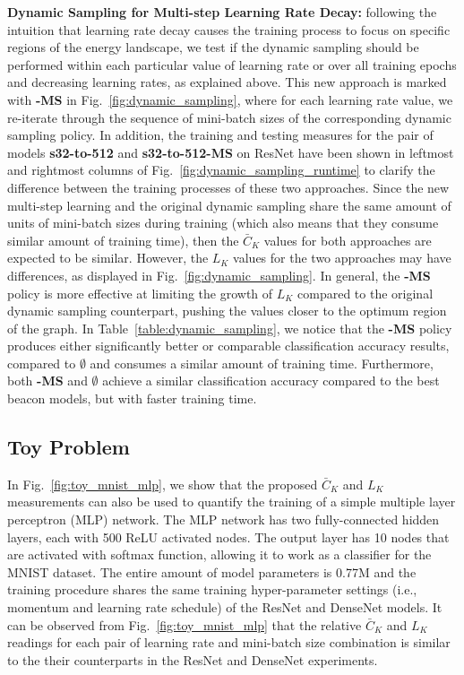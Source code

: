 \documentclass[10pt,journal,compsoc]{IEEEtran}
\begin{document}
\textbf{Dynamic Sampling for Multi-step Learning Rate Decay:}
following the intuition that learning rate decay causes the training process to focus on specific regions of the  energy landscape, we test if the dynamic sampling should be performed within each particular value of learning rate or over all training epochs and decreasing learning rates, as explained above.  This new approach is marked with {\bf -MS} in Fig.~\ref{fig:dynamic_sampling}, where for each learning rate value, we re-iterate through the sequence of mini-batch sizes of the corresponding dynamic sampling policy.
In addition, the training and testing measures for the pair of models {\bf s32-to-512} and {\bf s32-to-512-MS} on ResNet have been shown in leftmost and rightmost columns of Fig.~\ref{fig:dynamic_sampling_runtime} to clarify the difference between the training processes of these two approaches.  Since the new multi-step learning and the original dynamic sampling share the same amount of units of mini-batch sizes during training (which also means that they consume similar amount of training time), then the $\bar{C}_K$ values for both approaches are expected to be similar.  However, the $L_K$ values for the two approaches may have differences, as displayed in Fig.~\ref{fig:dynamic_sampling}.  In general, the {\bf -MS} policy is more effective at limiting the growth of $L_K$ compared to the original dynamic sampling counterpart, pushing the values closer to the optimum region of the graph.
In Table~\ref{table:dynamic_sampling}, we notice that the {\bf -MS} policy produces either significantly better or comparable classification accuracy results, compared to {\bf $\emptyset$} and consumes a similar amount of training time.  Furthermore, both {\bf -MS} and {\bf $\emptyset$} achieve a similar classification accuracy compared to the best beacon models, but with faster training time.

\subsection{Toy Problem}

In Fig.~\ref{fig:toy_mnist_mlp}, we show that the proposed $\bar{C}_K$ and $L_K$ measurements can also be used to quantify the training of a simple multiple layer perceptron (MLP) network. 
The MLP network has two fully-connected hidden layers, each with 500 ReLU activated nodes. 
The output layer has 10 nodes that are activated with softmax function, allowing it to work as a classifier for the MNIST dataset.
The entire amount of model parameters is 0.77M and the training procedure shares the same training hyper-parameter settings (i.e., momentum and learning rate schedule) of the ResNet and DenseNet models. 
It can be observed from Fig.~\ref{fig:toy_mnist_mlp} that the relative $\bar{C}_K$ and $L_K$ readings for each pair of learning rate and mini-batch size combination is similar to the their counterparts in the ResNet and DenseNet experiments.
\end{document}
